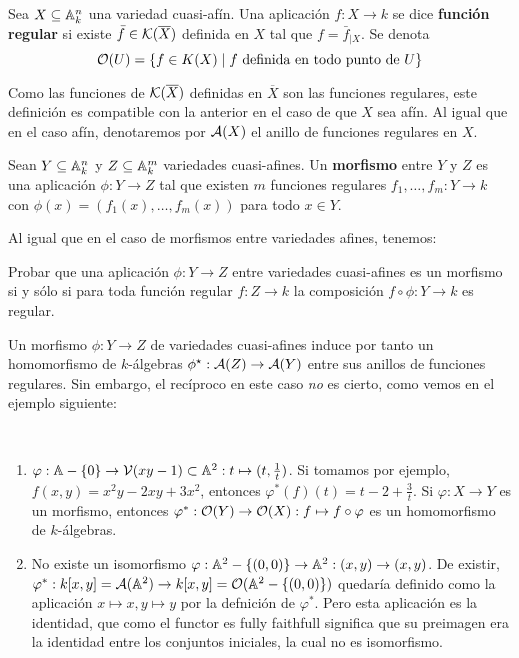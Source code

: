 \documentclass[ACGA.tex]{subfiles}
\begin{document}
\begin{defi}
 Sea $X\subseteq\mathbb{A}^n_k$ una variedad cuasi-afín. Una aplicación $f:X\to k$ se dice {\bf función regular} si existe $\bar f\in{\mathcal K}(\overline X)$ definida en $X$ tal que $f=\bar f_{|X}$. Se denota
$${\mathcal O}(U)=\{f\in K(X)\mid f\text{ definida en todo punto de } U\}$$
\end{defi}

Como las funciones de ${\mathcal K}(\overline X)$ definidas en $\overline X$ son las funciones regulares, este definición es compatible con la anterior en el caso de que $X$ sea afín. Al igual que en el caso afín, denotaremos por $\mathcal{A}(X)$ el anillo de funciones regulares en $X$.

\begin{defi}
 Sean $Y\subseteq\mathbb{A}^n_k$ y $Z\subseteq\mathbb{A}^m_k$ variedades cuasi-afines. Un {\bf morfismo} entre $Y$ y $Z$ es una aplicación $\phi:Y\to Z$ tal que existen $m$ funciones regulares $f_1,\ldots,f_m:Y\to k$ con $\phi(x)=(f_1(x),\ldots,f_m(x))$ para todo $x\in Y$.
\end{defi}

Al igual que en el caso de morfismos entre variedades afines, tenemos:
\begin{ejer}
 Probar que una aplicación $\phi:Y\to Z$ entre variedades cuasi-afines es un morfismo si y sólo si para toda función regular $f:Z\to k$ la composición $f\circ\phi:Y\to k$ es regular.
\end{ejer}

Un morfismo $\phi:Y\to Z$ de variedades cuasi-afines induce por tanto un homomorfismo de $k$-álgebras $\phi^\star:\mathcal{A}(Z)\to\mathcal{A}(Y)$ entre sus anillos de funciones regulares. Sin embargo, el recíproco en este caso \emph{no} es cierto, como vemos en el ejemplo siguiente:

\begin{ejs}\
\begin{enumerate}
\item $\varphi:\mathbb{A}-\{0\}\to\mathcal{V}(xy-1)\subset\mathbb{A}^2: t\mapsto (t,\frac{1}{t})$. Si tomamos por ejemplo, $f(x,y)=x^2y-2xy+3x^2$, entonces $\varphi^*(f)(t)=t-2+\frac{3}{t}$. Si $\varphi:X\to Y$ es un morfismo, entonces $\varphi^*:{\mathcal O}(Y)\to{\mathcal O}(X):f\mapsto f\circ\varphi$ es un homomorfismo de $k$-álgebras.
\item No existe un isomorfismo $\varphi:\mathbb{A}^2-\{(0,0)\}\to\mathbb{A}^2: (x,y)\to (x,y)$. De existir, $\varphi^*:k[x,y]=\mathcal{A}(\mathbb{A}^2)\to k[x,y]={\mathcal O}(\mathbb{A}^2-\{(0,0)\})$ quedaría definido como la aplicación $x\mapsto x, y\mapsto y$ por la defnición de $\varphi^*$. Pero esta aplicación es la identidad, que como el functor es fully faithfull significa que su preimagen era la identidad entre los conjuntos iniciales, la cual no es isomorfismo.

\end{enumerate}
\end{ejs}
\end{document}
